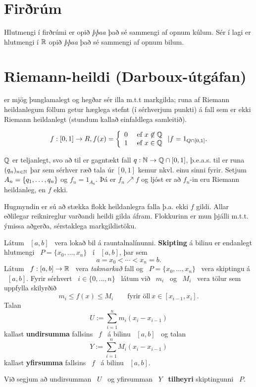 \documentclass[12pt]{report}
\begin{document}
\section*{Firðrúm}
Hlutmengi í firðrúmi er opið \emph{þþaa} það sé sammengi af opnum
kúlum. Sér í lagi er hlutmengi í $\mathbb{R}$ opið \emph{þþaa} það sé sammengi
af opnum bilum.

\section{Riemann-heildi (Darboux-útgáfan)}
er mjög þunglamalegt og hegðar sér illa m.t.t markgilda; runa af
Riemann heildanlegum föllum getur hæglega stefnt (í sérhverjum punkti)
á fall sem er ekki Riemann heildanlegt (stundum kallað einfaldlega
samleitið).

\begin{daemi}
  \[f: [0,1] \to R, f(x) = \left\{ \begin{array}{l l} 0 & \text{ ef } x \not\in \mathbb{Q} \\ 1 & \text{ ef } x
  \in \mathbb{Q} \end{array} \right. | f = 1_{Q \cap [0,1]}. \]

  $\mathbb{Q}$ er teljanlegt, svo að til er gagntækt fall
  $q: \mathbb{N} \to \mathbb{Q} \cap [0,1]$, þ.e.a.s. til er runa $(q_n)_{n \in \mathbb{N}}$
  þar sem sérhver ræð tala úr $[0,1]$ kemur nkvl. einu sinni
  fyrir. Setjum $A_n = \{q_1, \dotsc, q_n\}$ og $f_n = 1_{A_n}$. Þá
  er $f_n \nearrow f$ og ljóst er að $f_n$-in eru Riemann heildanleg,
  en $f$ ekki.

Hugmyndin er sú að stækka flokk heildanlegra falla þ.a. ekki $f$
  gildi.
Allar eðlilegar reiknireglur varðandi heildi gilda áfram.
Flokkurinn er mun þjálli m.t.t. ýmissa aðgerða, sérstaklega
  markgildistöku.
\end{daemi}

Látum \ $[a,b]$ \ vera lokað bil á rauntalnalínunni. {\bf Skipting} á bilinu er endanlegt hlutmengi \ $P = \{x_0,\ldots,x_n\}$ \ í \ $[a,b]$, þar sem 
$$
a=x_0 < \cdots < x_n = b.
$$
Látum \ $f : [a,b]\rightarrow \mathbb{R}$ \ vera {\em takmarkað} fall og  \ $P = \{x_0,\ldots,x_n\}$ \ vera skiptingu á  \ $[a,b]$. Fyrir sérhvert \ $i\in\{0,\ldots,n\}$ \ látum við \ $m_i$ \ og \ $M_i$ \ vera tölur sem uppfylla skilyrðið
$$
m_i\leq f(x) \leq M_i\qquad \text{fyrir öll} \ x\in[x_{i-1},x_i].
$$
Talan 
$$
U := \sum_{i=1}^nm_i(x_i - x_{i-1})
$$
kallast {\bf undirsumma} fallsins \ $f$ \ á bilinu \ $[a,b]$ \ og talan 
$$
Y := \sum_{i=1}^nM_i(x_i - x_{i-1})
$$
kallast {\bf yfirsumma} fallsins \ $f$ \ á bilinu \ $[a,b]$.

Við segjum að undirsumman \ $U$ \ og yfirsumman \ $Y$ \ {\bf tilheyri} skiptingunni \ $P$.
\end{document}
